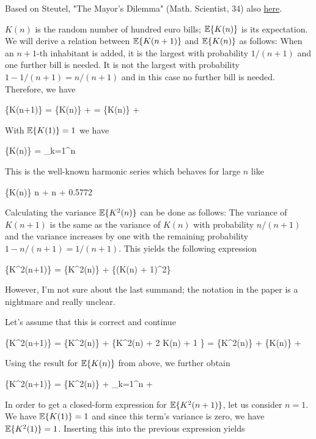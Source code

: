 
Based on Steutel, "The Mayor's Dilemma" (Math. Scientist, 34) also  \href{files/34_2_1.pdf}{here}.

$K(n)$ is the random number of hundred euro bills; $\mathbb{E}\{K(n)\}$ is its expectation. We will derive a relation between $\mathbb{E}\{K(n+1)\}$ and $\mathbb{E}\{K(n)\}$ as follows: When an $n+1$-th inhabitant is added, it is the largest with probability $1/(n+1)$ and one further bill is needed. It is not the largest with probability $1 - 1/(n+1) = n/(n+1)$ and in this case no further bill is needed. Therefore, we have 

\bee
\mE\{K(n+1)\} = \mE\{K(n)\} + \left[ \mE\{K(n)\}+1 \right] = \mE\{K(n)\} + 
\eee

With $\mathbb{E}\{K(1)\} = 1$ we have

\bee
\mE\{K(n)\} = \sum_{k=1}^n 
\eee

This is the well-known harmonic series which behaves for large $n$ like

\bee
\mE\{K(n)\} \approx \log n + \gamma \approx \log n + 0.5772
\eee


Calculating the variance $\mathbb{E}\{K^2(n)\}$ can be done as follows: The variance of $K(n+1)$ is the same as the variance of $K(n)$ with probability $n/(n+1)$ and the variance increases by one with the remaining probability $1 - n/(n+1) = 1/(n+1)$. This yields the following expression

\be
\label{2017-11-16:eq1}
\mE\{K^2(n+1)\} =  \mE\{K^2(n)\} +  \mE\{(K(n) + 1)^2\}
\ee

However, I'm not sure about the last summand; the notation in the paper is a nightmare and really unclear.

Let's assume that this is correct and continue

\bee
\mE\{K^2(n+1)\} =  \mE\{K^2(n)\} +  \mE\{K^2(n) + 2 K(n) + 1 \} = \mE\{K^2(n)\} +  \mE\{K(n)\} + 
\eee

Using the result for $\mathbb{E}\{K(n)\}$ from above, we further obtain

\bee
\mE\{K^2(n+1)\} = \mE\{K^2(n)\} +  \sum_{k=1}^n  + 
\eee

In order to get a closed-form expression for $\mathbb{E}\{K^2(n+1)\}$, let us consider $n=1$. We have $\mathbb{E}\{K(1)\} = 1$ and since this term's variance is zero, we have $\mathbb{E}\{K^2(1)\} = 1$. Inserting this into the previous expression yields

